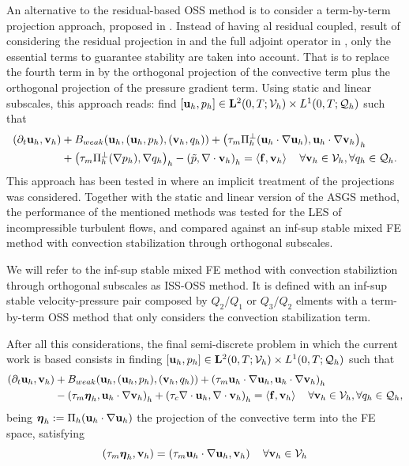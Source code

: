 An alternative to the residual-based OSS method is to consider a term-by-term projection approach, proposed in \cite{codina_analysis_2008}. Instead of having al residual coupled, result of considering the residual projection in  and the full adjoint operator in , only the essential terms to guarantee stability are taken into account. That is to replace the fourth term in  by the orthogonal projection of the convective term plus the orthogonal projection of the pressure gradient term. Using static and linear subscales, this approach reads: find 
$[{\bf u}_h,p_h]\in\mathbf{L}^2(0,T;\mathcal{V}_{h})\times L^1(0,T;\mathcal{Q}_{h})$ such that
\begin{align}
\label{eq-C7_NS_vms_tbtoss}
(\partial_t{\bf u}_h,{\bf v}_h)&+B_{weak}({\bf u}_h,({\bf u}_h,p_h),({\bf v}_h,q_h))+\left(\tau_m\Pi_h^\perp({\bf u}_h\cdot\nabla{\bf u}_h),{\bf u}_h\cdot\nabla{\bf v}_h\right)_h\\\nonumber
&+\left(\tau_m\Pi_h^\perp(\nabla p_h),\nabla q_h\right)_h-\left(\tilde{p},\nabla\cdot{\bf v}_h\right)_h=\left<{\bf f},{\bf v}_h\right>
\quad\forall{\bf v}_h\in\mathcal{V}_{h},\forall q_h\in\mathcal{Q}_{h}.
\end{align}
This approach has been tested in  where an implicit treatment of the projections was considered. Together with the static and linear version of the ASGS method, the performance of the mentioned methods was tested for the LES of incompressible turbulent flows, and compared against an inf-sup stable mixed FE method with convection stabilization through orthogonal subscales.

We will refer to the inf-sup stable mixed FE method with convection stabiliztion through orthogonal subscales as ISS-OSS method. It is defined with an inf-sup stable velocity-pressure pair composed by $ Q_2/Q_1 $ or $ Q_3/Q_2 $ elments with a term-by-term OSS method that only considers the convection stabilization term.

After all this considerations, the final semi-discrete problem in which the current work is based consists in finding 
$[{\bf u}_h,p_h]\in\mathbf{L}^2(0,T;\mathcal{V}_{h})\times L^1(0,T;\mathcal{Q}_{h})$ such that
\begin{align}
\label{eq-C7_NS_vms_mfe_oss}
(\partial_t{\bf u}_h,{\bf v}_h)&+B_{weak}({\bf u}_h,({\bf u}_h,p_h),({\bf v}_h,q_h))+\left(\tau_m{\bf u}_h\cdot\nabla{\bf u}_h,{\bf u}_h\cdot\nabla{\bf v}_h\right)_h\\\nonumber
&-\left(\tau_m\boldsymbol{\eta}_h,{\bf u}_h\cdot\nabla{\bf v}_h\right)_h+\left(\tau_c\nabla\cdot{\bf u}_h,\nabla\cdot{\bf v}_h\right)_h=\left<{\bf f},{\bf v}_h\right>
\quad\forall{\bf v}_h\in\mathcal{V}_{h},\forall q_h\in\mathcal{Q}_{h},
\end{align}
being $ \boldsymbol{\eta}_h:=\Pi_h({\bf u}_h\cdot\nabla{\bf u}_h) $ the projection of the convective term into the FE space, satisfying
\begin{equation}
\label{eq-C7_NS_projection}
\left(\tau_m\boldsymbol{\eta}_h,{\bf v}_h\right)=\left(\tau_m{\bf u}_h\cdot\nabla{\bf u}_h,{\bf v}_h\right)\quad\forall{\bf v}_h\in\mathcal{V}_{h}
\end{equation}

